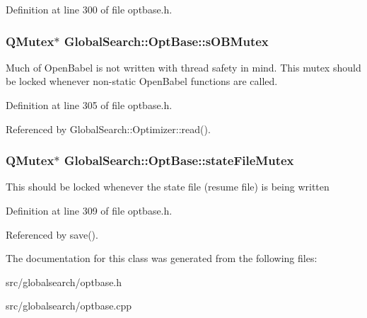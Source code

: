Definition at line 300 of file optbase.\+h.

\hypertarget{classGlobalSearch_1_1OptBase_a86c1868458b6f8430dc366c009c9deb5}{}
\subsubsection[{s\+O\+B\+Mutex}]{\setlength{\rightskip}{0pt plus 5cm}Q\+Mutex$\ast$ Global\+Search\+::\+Opt\+Base\+::s\+O\+B\+Mutex}\label{classGlobalSearch_1_1OptBase_a86c1868458b6f8430dc366c009c9deb5}
Much of Open\+Babel is not written with thread safety in mind. This mutex should be locked whenever non-\/static Open\+Babel functions are called. 

Definition at line 305 of file optbase.\+h.



Referenced by Global\+Search\+::\+Optimizer\+::read().

\hypertarget{classGlobalSearch_1_1OptBase_af0df28a179c8a89022f4887c18761956}{}
\subsubsection[{state\+File\+Mutex}]{\setlength{\rightskip}{0pt plus 5cm}Q\+Mutex$\ast$ Global\+Search\+::\+Opt\+Base\+::state\+File\+Mutex}\label{classGlobalSearch_1_1OptBase_af0df28a179c8a89022f4887c18761956}
This should be locked whenever the state file (resume file) is being written 

Definition at line 309 of file optbase.\+h.



Referenced by save().



The documentation for this class was generated from the following files\+:\begin{DoxyCompactItemize}
\item 
src/globalsearch/optbase.\+h\item 
src/globalsearch/optbase.\+cpp\end{DoxyCompactItemize}
